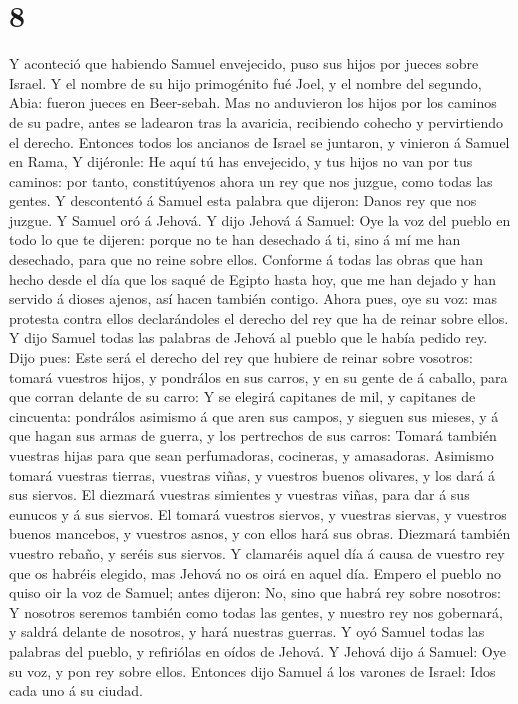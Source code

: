 \hypertarget{section-7}{%
\section{8}\label{section-7}}

 Y aconteció que habiendo Samuel envejecido, puso sus hijos
por jueces sobre Israel.  Y el nombre de su hijo primogénito
fué Joel, y el nombre del segundo, Abia: fueron jueces en Beer-sebah.
 Mas no anduvieron los hijos por los caminos de su padre,
antes se ladearon tras la avaricia, recibiendo cohecho y pervirtiendo el
derecho.  Entonces todos los ancianos de Israel se juntaron,
y vinieron á Samuel en Rama,  Y dijéronle: He aquí tú has
envejecido, y tus hijos no van por tus caminos: por tanto, constitúyenos
ahora un rey que nos juzgue, como todas las gentes.  Y
descontentó á Samuel esta palabra que dijeron: Danos rey que nos juzgue.
Y Samuel oró á Jehová.  Y dijo Jehová á Samuel: Oye la voz
del pueblo en todo lo que te dijeren: porque no te han desechado á ti,
sino á mí me han desechado, para que no reine sobre ellos. 
Conforme á todas las obras que han hecho desde el día que los saqué de
Egipto hasta hoy, que me han dejado y han servido á dioses ajenos, así
hacen también contigo.  Ahora pues, oye su voz: mas protesta
contra ellos declarándoles el derecho del rey que ha de reinar sobre
ellos.  Y dijo Samuel todas las palabras de Jehová al
pueblo que le había pedido rey.  Dijo pues: Este será el
derecho del rey que hubiere de reinar sobre vosotros: tomará vuestros
hijos, y pondrálos en sus carros, y en su gente de á caballo, para que
corran delante de su carro:  Y se elegirá capitanes de mil,
y capitanes de cincuenta: pondrálos asimismo á que aren sus campos, y
sieguen sus mieses, y á que hagan sus armas de guerra, y los pertrechos
de sus carros:  Tomará también vuestras hijas para que sean
perfumadoras, cocineras, y amasadoras.  Asimismo tomará
vuestras tierras, vuestras viñas, y vuestros buenos olivares, y los dará
á sus siervos.  El diezmará vuestras simientes y vuestras
viñas, para dar á sus eunucos y á sus siervos.  El tomará
vuestros siervos, y vuestras siervas, y vuestros buenos mancebos, y
vuestros asnos, y con ellos hará sus obras.  Diezmará
también vuestro rebaño, y seréis sus siervos.  Y clamaréis
aquel día á causa de vuestro rey que os habréis elegido, mas Jehová no
os oirá en aquel día.  Empero el pueblo no quiso oir la voz
de Samuel; antes dijeron: No, sino que habrá rey sobre nosotros:
 Y nosotros seremos también como todas las gentes, y
nuestro rey nos gobernará, y saldrá delante de nosotros, y hará nuestras
guerras.  Y oyó Samuel todas las palabras del pueblo, y
refiriólas en oídos de Jehová.  Y Jehová dijo á Samuel: Oye
su voz, y pon rey sobre ellos. Entonces dijo Samuel á los varones de
Israel: Idos cada uno á su ciudad.

